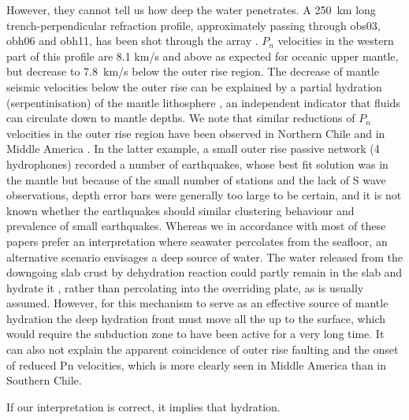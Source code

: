 \documentclass[reviewcopy]{elsart}
\begin{document}
\begin{enumerate}
  However,
they cannot tell us how deep the water penetrates.  
A 250~km long
trench-perpendicular  refraction
profile, approximately passing through obs03, obh06 and obh11, has
been shot through the array \citep{contreras-reyes07}. $P_n$
velocities in the western part of this profile are 8.1 km/s and above
as expected for oceanic upper mantle, but decrease to 7.8~km/s below
the outer rise region.
The decrease of mantle seismic velocities below the outer rise can be
explained by a partial hydration (serpentinisation) of the mantle lithosphere 
\citep{contreras-reyes07}, an independent indicator that fluids can
circulate down to mantle depths.   We note that similar reductions of $P_n$
velocities in the outer rise region have been observed in Northern
Chile \citep{ranero04} and in Middle
America \citep{grevemeyer07}.  In the latter example, a small outer
rise passive network (4 hydrophones) recorded a number of earthquakes, whose best fit
solution was in the mantle but because of the small number of stations
and the lack of S wave observations, depth error bars were generally
too large to be certain, and it is not known whether the earthquakes
should similar clustering behaviour and prevalence of small
earthquakes. 
 Whereas we in accordance with most of these papers
prefer an interpretation where seawater percolates from the seafloor,
an alternative scenario envisages a deep source of water. The water
released from the downgoing slab crust by dehydration reaction could
partly remain in the slab and hydrate it \citep{abers03,robin07abs},
rather than percolating into the overriding plate, as is usually
assumed.  However, for this mechanism to serve as an effective source
of mantle hydration the deep hydration front must move all the up to
the surface, which would require the subduction zone to have been
active for a very long time.  It can also not explain the apparent
coincidence of outer rise faulting and the onset of reduced Pn
velocities, which is more clearly seen in Middle
America \citep{grevemeyer07} than in Southern Chile.
\end{enumerate}
If our interpretation is correct, it implies that hydration.
\end{document}
